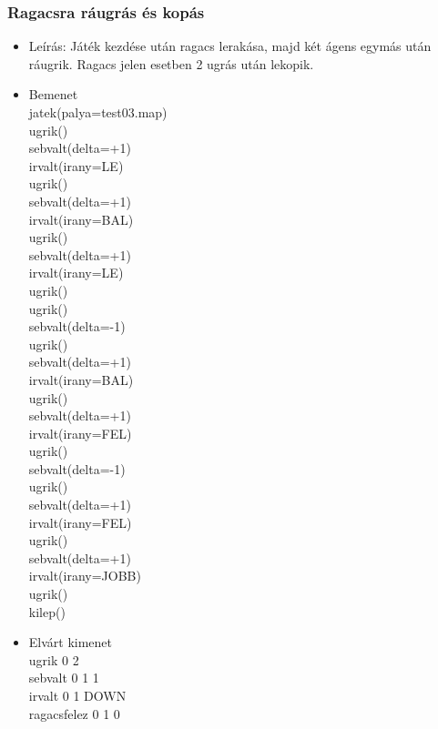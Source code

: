 \subsubsection{Ragacsra ráugrás és kopás}
\begin{itemize}
	\item Leírás: Játék kezdése után ragacs lerakása, majd két ágens egymás után ráugrik. Ragacs jelen esetben 2 ugrás után lekopik.
	\item Bemenet\\
    jatek(palya=test03.map)\\
    ugrik()\\
    sebvalt(delta=+1)\\
    irvalt(irany=LE)\\
    ugrik()\\
    sebvalt(delta=+1)\\
    irvalt(irany=BAL)\\
    ugrik()\\
    sebvalt(delta=+1)\\
    irvalt(irany=LE)\\
    ugrik()\\
    ugrik()\\
    sebvalt(delta=-1)\\
    ugrik()\\
    sebvalt(delta=+1)\\
    irvalt(irany=BAL)\\
    ugrik()\\
    sebvalt(delta=+1)\\
    irvalt(irany=FEL)\\
    ugrik()\\
    sebvalt(delta=-1)\\
    ugrik()\\
    sebvalt(delta=+1)\\
    irvalt(irany=FEL)\\
    ugrik()\\
    sebvalt(delta=+1)\\
    irvalt(irany=JOBB)\\
    ugrik()\\
    kilep()\\
	\item Elvárt kimenet\\
    ugrik 0 2 \\
    sebvalt 0 1 1 \\
    irvalt 0 1 DOWN \\
    ragacsfelez 0 1 0 \\

\end{itemize}
